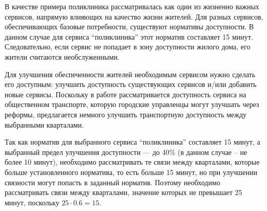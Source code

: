В качестве примера поликлиника рассматривалась как один из жизненно важных сервисов, напрямую влияющих на качество жизни жителей. Для разных сервисов, обеспечивающих базовые потребности, существуют нормативы доступности. В данном случае для сервиса ``поликлиника'' этот норматив составляет 15 минут. Следовательно, если сервис не попадает в зону доступности жилого дома, его жители считаются необслуженными.

Для улучшения обеспеченности жителей необходимым сервисом нужно сделать его доступным: улучшить доступность существующих сервисов и/или добавить новые сервисы. Поскольку в работе рассматривается доступность сервиса на общественном транспорте, которую городские управленцы могут улучшать через реформы, предлагается немного улучшить транспортную доступность между выбранными кварталами.

Так как норматив для выбранного сервиса ``поликлиника'' составляет 15 минут, а выбранный предел улучшения доступности --- до 40\% (в данном случае -- не более 10 минут), необходимо рассматривать те связи между кварталами, которые больше установленного норматива, то есть больше 15 минут, но при улучшении связности могут попасть в заданный норматив. Поэтому необходимо рассматривать связи между кварталами, значение которых не превышает 25 минут, поскольку $25 \cdot 0.6 = 15$.
%


